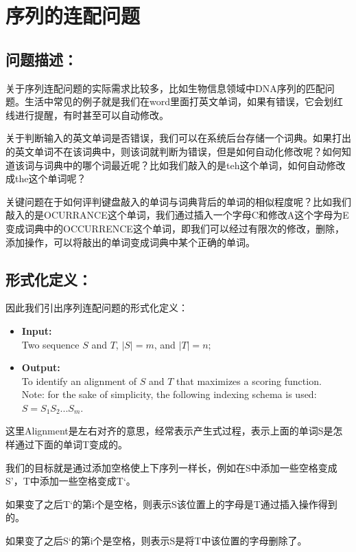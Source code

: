 \section{序列的连配问题}

\subsection{问题描述：}

关于序列连配问题的实际需求比较多，比如生物信息领域中DNA序列的匹配问题。生活中常见的例子就是我们在word里面打英文单词，如果有错误，它会划红线进行提醒，有时甚至可以自动修改。

关于判断输入的英文单词是否错误，我们可以在系统后台存储一个词典。如果打出的英文单词不在该词典中，则该词就判断为错误，但是如何自动化修改呢？如何知道该词与词典中的哪个词最近呢？比如我们敲入的是teh这个单词，如何自动修改成the这个单词呢？

关键问题在于如何评判键盘敲入的单词与词典背后的单词的相似程度呢？比如我们敲入的是OCURRANCE这个单词，我们通过插入一个字母C和修改A这个字母为E变成词典中的OCCURRENCE这个单词，即我们可以经过有限次的修改，删除，添加操作，可以将敲出的单词变成词典中某个正确的单词。

\subsection{形式化定义：}

因此我们引出序列连配问题的形式化定义：

\begin{itemize}
    \item {\bf Input:}\\ Two sequence $S$ and $T$, $|S|=m$, and $|T|=n$;
	\item {\bf Output:}\\  To identify an alignment of $S$ and $T$ that maximizes a scoring function.
	\\
	
	Note: for the sake of simplicity, the following indexing schema is used: $S=S_1S_2...S_m$.
\end{itemize}

这里Alignment是左右对齐的意思，经常表示产生式过程，表示上面的单词S是怎样通过下面的单词T变成的。

我们的目标就是通过添加空格使上下序列一样长，例如在S中添加一些空格变成S’，T中添加一些空格变成T‘。

如果变了之后T‘的第i个是空格，则表示S该位置上的字母是T通过插入操作得到的。

如果变了之后S‘的第i个是空格，则表示S是将T中该位置的字母删除了。

